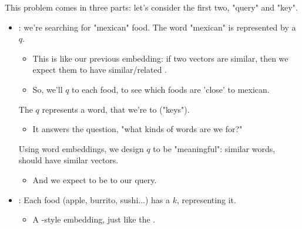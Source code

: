         \phantom{}

        This problem comes in three parts: let's consider the first two, "query" and "key".

        \begin{itemize}
            \item {}: we're searching for "mexican" food. The word "mexican" is represented by a  $q$. 
            
            \begin{itemize}
                \item This is like our previous  embedding: if two vectors are similar, then we expect them to have similar/related .
                \item So, we'll  $q$ to each food, to see which foods are 'close' to mexican.\\
            \end{itemize}

            \begin{definition}
                The  $q$ represents a word, that we're  to  ("keys").

                \begin{itemize}
                    \item It answers the question, "what kinds of words are we  for?" 
                \end{itemize}

                Using word embeddings, we design $q$ to be "meaningful": similar words, should have similar vectors.
                
                \begin{itemize}
                    \item And we expect  to be  to our query.
                \end{itemize} 
            \end{definition}

            \phantom{}

            \item {}: Each food (apple, burrito, sushi...) has a  $k$, representing it. 
            
            \begin{itemize}
                \item A -style embedding, just like the .


\end{itemize}
\end{itemize}
